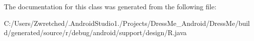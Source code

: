 The documentation for this class was generated from the following file\+:\begin{DoxyCompactItemize}
\item 
C\+:/\+Users/\+Zwretched/.\+Android\+Studio1./\+Projects/\+Dress\+Me\+\_\+\+Android/\+Dress\+Me/build/generated/source/r/debug/android/support/design/R.\+java\end{DoxyCompactItemize}
